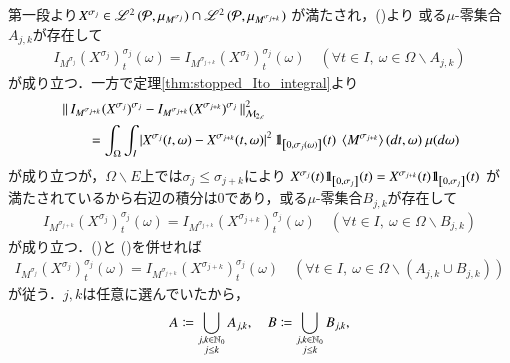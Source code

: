 \begin{prf}
\begin{description}
				第一段より$X^{\sigma_j} \in \mathscr{L}^{2} \left(\mathcal{P},\mu_{M^{\sigma_j}}\right) \cap \mathscr{L}^{2} \left(\mathcal{P},\mu_{M^{\sigma_{j+k}}}\right)$
				が満たされ，()より
				或る$\mu$-零集合$A_{j,k}$が存在して
				\begin{align}
					I_{M^{\sigma_j}}(X^{\sigma_j})^{\sigma_j}_t(\omega) = I_{M^{\sigma_{j+k}}}(X^{\sigma_j})^{\sigma_j}_t(\omega)
					\quad (\forall t \in I,\ \omega \in \Omega \backslash A_{j,k})
					\label{eq:thm_Ito_integral_on_M_c_loc_and_left_cont_locally_bounded_4}
				\end{align}
				が成り立つ．一方で定理\ref{thm:stopped_Ito_integral}より
				\begin{align}
					&\Norm{I_{M^{\sigma_{j+k}}}(X^{\sigma_j})^{\sigma_j} - I_{M^{\sigma_{j+k}}}(X^{\sigma_{j+k}})^{\sigma_j}}{\mathcal{M}_{2,c}}^2 \\
					&\qquad = \int_\Omega \int_I \left| X^{\sigma_j}(t,\omega) - X^{\sigma_{j+k}}(t,\omega) \right|^2 
						\defunc_{\left[0,\sigma_j(\omega)\right]}(t)\ \inprod<M^{\sigma_{j+k}}>(dt,\omega)\ \mu(d\omega)
				\end{align}
				が成り立つが，$\Omega \backslash E$上では$\sigma_j \leq \sigma_{j+k}$により
				$X^{\sigma_j}(t) \mbox{1}\hspace{-0.25em}\mbox{l}_{\left[0,\sigma_j\right]}(t) = X^{\sigma_{j+k}}(t) \mbox{1}\hspace{-0.25em}\mbox{l}_{\left[0,\sigma_j\right]}(t)$
				が満たされているから右辺の積分は0であり，或る$\mu$-零集合$B_{j,k}$が存在して
				\begin{align}
					I_{M^{\sigma_{j+k}}}(X^{\sigma_j})^{\sigma_j}_t(\omega) = I_{M^{\sigma_{j+k}}}(X^{\sigma_{j+k}})^{\sigma_j}_t(\omega)
					\quad (\forall t \in I,\ \omega \in \Omega \backslash B_{j,k})
					\label{eq:thm_Ito_integral_on_M_c_loc_and_left_cont_locally_bounded_5}
				\end{align}
				が成り立つ．()と
				()を併せれば
				\begin{align}
					I_{M^{\sigma_j}}(X^{\sigma_j})^{\sigma_j}_t(\omega) = I_{M^{\sigma_{j+k}}}(X^{\sigma_{j+k}})^{\sigma_j}_t(\omega)
					\quad \left( \forall t \in I,\ \omega \in \Omega \backslash \left( A_{j,k} \cup B_{j,k} \right) \right)
				\end{align}
				が従う．$j,k$は任意に選んでいたから，
				\begin{align}
					A \coloneqq \bigcup_{\substack{j,k \in \N_0\\j \leq k}} A_{j,k},
					\quad B \coloneqq \bigcup_{\substack{j,k \in \N_0\\j \leq k}} B_{j,k},

\end{align}
\end{description}
\end{prf}

